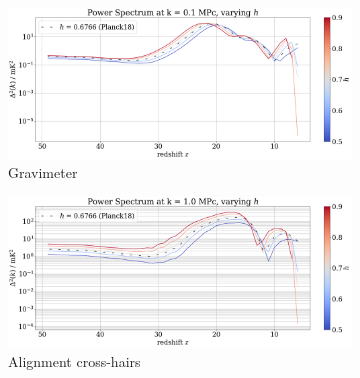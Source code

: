 \documentclass[floats,floatfix,showpacs,amssymb,prd,superscriptaddress,nofootinbib]{revtex4-2} %
\newcommand{\red}{\textcolor{red}}
\begin{document}
\begin{figure}[H]
     \centering
     \begin{subfigure}[b]{0.9\textwidth}
         \centering
         \includegraphics[width=\textwidth]{images/simulation_results/power_spectrum_fixed_k_0.1_h.png}
         \caption{Gravimeter}
         \label{fig:IC_Om1}
     \end{subfigure}
     \hfill
     \begin{subfigure}[b]{0.9\textwidth}
         \centering
         \includegraphics[width=\textwidth]{images/simulation_results/power_spectrum_fixed_k_1.0_h.png}
         \caption{Alignment cross-hairs}
         \label{fig:IC_Om5}
     \end{subfigure}
        \caption{}
        \label{fig:apparatus}
\end{figure}

\end{document}
